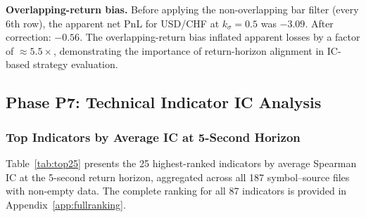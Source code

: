 \documentclass[12pt,a4paper]{article}
\theoremstyle{definition}
\theoremstyle{remark}
\begin{document}
\begin{keyresult}
\textbf{Overlapping-return bias.} Before applying the non-overlapping
bar filter (every 6th row), the apparent net PnL for USD/CHF at
$k_\sigma=0.5$ was $-3.09$. After correction: $-0.56$.
The overlapping-return bias inflated apparent losses by a factor
of $\approx5.5\times$, demonstrating the importance of return-horizon
alignment in IC-based strategy evaluation.
\end{keyresult}

\subsection{Phase P7: Technical Indicator IC Analysis}
\label{sec:p7_results}

\subsubsection{Top Indicators by Average IC at 5-Second Horizon}

Table~\ref{tab:top25} presents the 25 highest-ranked indicators by
average Spearman IC at the 5-second return horizon, aggregated across
all 187 symbol--source files with non-empty data. The complete
ranking for all 87 indicators is provided in
Appendix~\ref{app:fullranking}.
\end{document}
